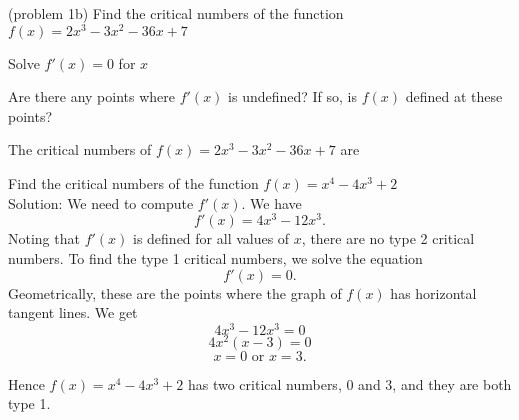 \documentclass[handout]{ximera}
\begin{document}
\begin{problem}(problem 1b)
  Find the critical numbers of the function $f(x) = 2x^3 - 3x^2 -36x + 7$
    
		\begin{hint}
      Solve $f'(x) = 0$ for $x$
    \end{hint}
    \begin{hint}
      Are there any points where $f'(x)$ is undefined?
      If so, is $f(x)$ defined at these points?  
		\end{hint}
    
    
		The critical numbers of $f(x) = 2x^3 - 3x^2 -36x + 7$ are
		\begin{multipleChoice}
		\end{multipleChoice}
		\end{problem}

\begin{example}[example 2]
Find the critical numbers of the function $f(x) = x^4 - 4x^3 + 2$\\
Solution: We need to compute $f'(x)$.  We have
\[f'(x) = 4x^3 - 12x^3.\]
Noting that $f'(x)$ is defined for all values of $x$, there are no type 2 critical numbers.
To find the type 1 critical numbers, we solve the equation
\[f'(x) = 0.\]
Geometrically, these are the points where the graph of $f(x)$ has horizontal tangent lines.
We get
\[ 4x^3 - 12x^3 =0\]
\[ 4x^2(x-3) =0\]
\[x = 0 \mbox{  or  } x = 3.\]

Hence $f(x) = x^4 - 4x^3 + 2$ has two critical numbers, $0$ and $3$, and they are both type 1.
\begin{image}
\end{image}

\end{example}
\end{document}
